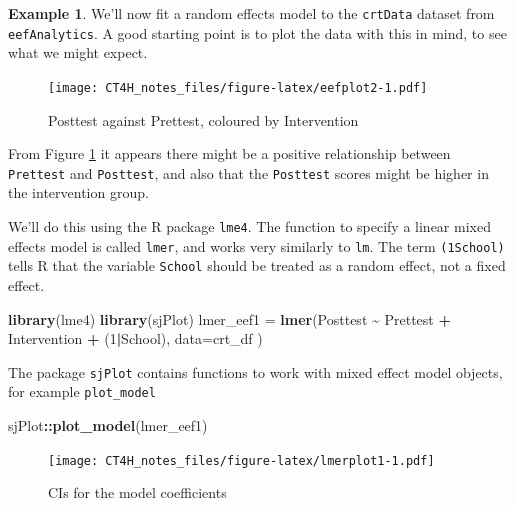 \documentclass[
  openany]{book}
\newenvironment{Shaded}{\begin{snugshade}}{\end{snugshade}}
\newcommand{\AttributeTok}[1]{\textcolor[rgb]{0.13,0.29,0.53}{#1}}
\newcommand{\DecValTok}[1]{\textcolor[rgb]{0.00,0.00,0.81}{#1}}
\newcommand{\FunctionTok}[1]{\textcolor[rgb]{0.13,0.29,0.53}{\textbf{#1}}}
\newcommand{\NormalTok}[1]{#1}
\newcommand{\OtherTok}[1]{\textcolor[rgb]{0.56,0.35,0.01}{#1}}
\newcommand{\SpecialCharTok}[1]{\textcolor[rgb]{0.81,0.36,0.00}{\textbf{#1}}}
\theoremstyle{definition}
\theoremstyle{definition}
\newtheorem{example}{Example}[chapter]
\theoremstyle{definition}
\theoremstyle{definition}
\theoremstyle{remark}
\begin{document}
\begin{example}
We'll now fit a random effects model to the \texttt{crtData} dataset from \texttt{eefAnalytics}. A good starting point is to plot the data with this in mind, to see what we might expect.

\begin{figure}
\centering
\texttt{[image: CT4H\_notes\_files/figure-latex/eefplot2-1.pdf]}
\caption{\label{fig:eefplot2}Posttest against Prettest, coloured by Intervention}
\end{figure}

From Figure \ref{fig:eefplot2} it appears there might be a positive relationship between \texttt{Prettest} and \texttt{Posttest}, and also that the \texttt{Posttest} scores might be higher in the intervention group.

We'll do this using the R package \texttt{lme4}. The function to specify a linear mixed effects model is called \texttt{lmer}, and works very similarly to \texttt{lm}. The term \texttt{(1\textbar{}School)} tells R that the variable \texttt{School} should be treated as a random effect, not a fixed effect.

\begin{Shaded}
\begin{Highlighting}[]
\FunctionTok{library}\NormalTok{(lme4) }
\FunctionTok{library}\NormalTok{(sjPlot)}
\NormalTok{lmer\_eef1 }\OtherTok{=} \FunctionTok{lmer}\NormalTok{(Posttest }\SpecialCharTok{\textasciitilde{}}\NormalTok{ Prettest }\SpecialCharTok{+}\NormalTok{ Intervention }\SpecialCharTok{+}\NormalTok{ (}\DecValTok{1}\SpecialCharTok{|}\NormalTok{School), }\AttributeTok{data=}\NormalTok{crt\_df )}
\end{Highlighting}
\end{Shaded}

The package \texttt{sjPlot} contains functions to work with mixed effect model objects, for example \texttt{plot\_model}

\begin{Shaded}
\begin{Highlighting}[]
\NormalTok{sjPlot}\SpecialCharTok{::}\FunctionTok{plot\_model}\NormalTok{(lmer\_eef1)}
\end{Highlighting}
\end{Shaded}

\begin{figure}
\centering
\texttt{[image: CT4H\_notes\_files/figure-latex/lmerplot1-1.pdf]}
\caption{\label{fig:lmerplot1}CIs for the model coefficients}
\end{figure}


\end{example}
\end{document}
